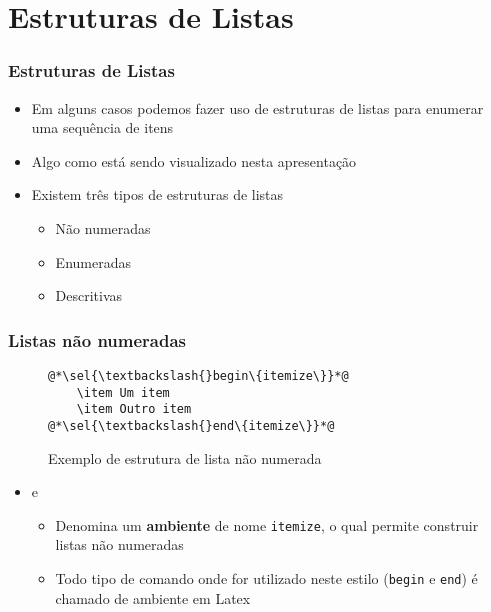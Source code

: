 \section{Estruturas de Listas}

\begin{frame}[fragile] \frametitle{Estruturas de Listas}
\begin{itemize}
	\item Em alguns casos podemos fazer uso de estruturas de listas para enumerar uma sequência de itens
	\item Algo como está sendo visualizado nesta apresentação
	\item Existem três tipos de estruturas de listas
	\begin{itemize}
		\item Não numeradas
		\item Enumeradas
		\item Descritivas
	\end{itemize}
\end{itemize}
\end{frame}

\begin{frame}[fragile] \frametitle{Listas não numeradas}
\begin{figure}[!t]
\caption{Exemplo de estrutura de lista não numerada}
\begin{lstlisting}
@*\sel{\textbackslash{}begin\{itemize\}}*@
	\item Um item
	\item Outro item
@*\sel{\textbackslash{}end\{itemize\}}*@
\end{lstlisting}
\ownsrc
\end{figure}

\begin{itemize}
	\item {} e 
	\begin{itemize}
		\item Denomina um \textbf{ambiente} de nome \texttt{itemize}, o qual permite construir listas não numeradas
		\item Todo tipo de comando onde for utilizado neste estilo (\texttt{begin} e \texttt{end}) é chamado de ambiente em Latex
	\end{itemize}
\end{itemize}
\end{frame}

